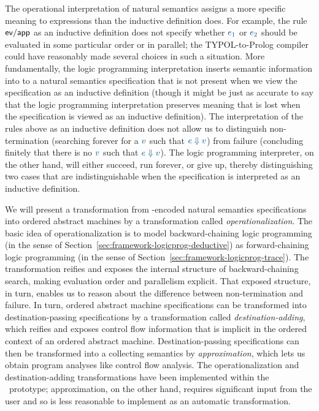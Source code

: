 The operational interpretation of natural semantics assigns a more
specific meaning to expressions than the inductive definition does.
For example, the rule ${\sf ev/app}$ as an inductive definition does
not specify whether $\obj{e_1}$ or $\obj{e_2}$ should be evaluated in
some particular order or in parallel; the TYPOL-to-Prolog compiler
could have reasonably made several choices in such a situation. More
fundamentally, the logic programming interpretation inserts semantic
information into to a natural semantics specification that is not
present when we view the specification as an inductive definition
(though it might be just as accurate to say that the logic programming
interpretation preserves meaning that is lost when the specification
is viewed as an inductive definition). The interpretation of the rules
above as an inductive definition does not allow us to distinguish
non-termination (searching forever for a $\obj{v}$ such that $\obj{e
  \Downarrow v}$) from failure (concluding finitely that there is no
$\obj{v}$ such that $\obj{e \Downarrow v}$).  The logic programming
interpreter, on the other hand, will either succeed, run forever, or
give up, thereby distinguishing two cases that are indistinguishable
when the specification is interpreted as an inductive definition.

We will present a transformation from \sls-encoded natural semantics
specifications into ordered abstract machines by a transformation
called {\it operationalization}. The basic idea of operationalization
is to model backward-chaining logic programming (in the sense of
Section~\ref{sec:framework-logicprog-deductive}) as forward-chaining
logic programming (in the sense of
Section~\ref{sec:framework-logicprog-trace}). The transformation
reifies and exposes the internal structure of backward-chaining
search, making evaluation order and parallelism explicit. That exposed
structure, in turn, enables us to reason about the difference between
non-termination and failure. In turn, ordered abstract machine
specifications can be transformed into destination-passing
specifications by a transformation called {\it destination-adding},
which reifies and exposes control flow information that is implicit in
the ordered context of an ordered abstract machine.
Destination-passing specifications can then be transformed into a
collecting semantics by {\it approximation}, which lets us obtain
program analyses like control flow analysis. The operationalization
and destination-adding transformations have been implemented within
the \sls~prototype; approximation, on the other hand, requires
significant input from the user and so is less reasonable to implement
as an automatic transformation.


